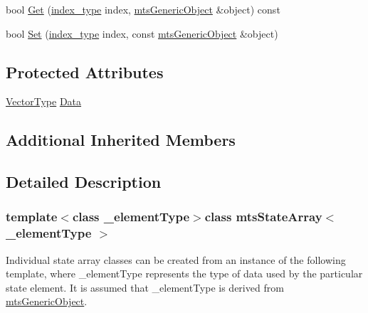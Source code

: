 {\bf }\par
\begin{DoxyCompactItemize}
\item 
bool \hyperlink{classmts_state_array_a8995237a36530f1d5e8704f8f30622e4}{Get} (\hyperlink{classmts_state_array_base_a22ecbf65a907a7550951d12970f3df1d}{index\-\_\-type} index, \hyperlink{classmts_generic_object}{mts\-Generic\-Object} \&object) const 
\item 
bool \hyperlink{classmts_state_array_a0375f515039b5904a33c535318bc9101}{Set} (\hyperlink{classmts_state_array_base_a22ecbf65a907a7550951d12970f3df1d}{index\-\_\-type} index, const \hyperlink{classmts_generic_object}{mts\-Generic\-Object} \&object)
\end{DoxyCompactItemize}

\subsection*{Protected Attributes}
\begin{DoxyCompactItemize}
\item 
\hyperlink{classmts_state_array_a4d8a41652bc6d14fb99d28c71286058a}{Vector\-Type} \hyperlink{classmts_state_array_a4ae00b885b6acad1662b1f77451ba791}{Data}
\end{DoxyCompactItemize}
\subsection*{Additional Inherited Members}


\subsection{Detailed Description}
\subsubsection*{template$<$class \-\_\-element\-Type$>$class mts\-State\-Array$<$ \-\_\-element\-Type $>$}

Individual state array classes can be created from an instance of the following template, where \-\_\-element\-Type represents the type of data used by the particular state element. It is assumed that \-\_\-element\-Type is derived from \hyperlink{classmts_generic_object}{mts\-Generic\-Object}. 

